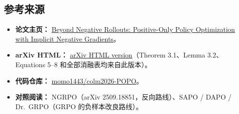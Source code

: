 \subsection{参考来源}

\begin{itemize}[leftmargin=1.5em]
  \item \textbf{论文主页：} \href{https://arxiv.org/abs/2605.06650}{Beyond Negative Rollouts: Positive-Only Policy Optimization with Implicit Negative Gradients}。
  \item \textbf{arXiv HTML：} \href{https://arxiv.org/html/2605.06650v1}{arXiv HTML version}（Theorem 3.1、Lemma 3.2、Equations 5--8 和全部消融表均来自此版本）。
  \item \textbf{代码仓库：} \href{https://github.com/momo1443/colm2026-POPO}{momo1443/colm2026-POPO}。
  \item \textbf{对照阅读：} NGRPO（arXiv 2509.18851，反向路线）、SAPO / DAPO / Dr.~GRPO（GRPO 的负样本改良路线）。
\end{itemize}
